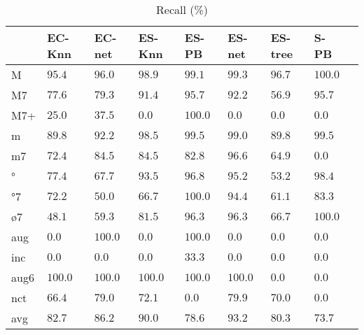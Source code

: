 \documentclass{article}
\begin{document}
\begin{table}
  \centering
\begin{tabular}{l|p{0.5cm}p{0.5cm}p{0.5cm}p{0.5cm}p{0.5cm}p{0.5cm}p{0.5cm}p{0.5cm}}
    &      EC-Knn &      EC-net &      ES-Knn &       ES-PB &      ES-net &     ES-tree &      S-PB \\ \hline
M   & $     95.4$ & $     96.0$ & $     98.9$ & $     99.1$ & $     99.3$ & $     96.7$ & $    100.0$ \\
M7  & $     77.6$ & $     79.3$ & $     91.4$ & $     95.7$ & $     92.2$ & $     56.9$ & $     95.7$ \\
M7+ & $     25.0$ & $     37.5$ & $      0.0$ & $    100.0$ & $      0.0$ & $      0.0$ & $      0.0$ \\
m   & $     89.8$ & $     92.2$ & $     98.5$ & $     99.5$ & $     99.0$ & $     89.8$ & $     99.5$ \\
m7  & $     72.4$ & $     84.5$ & $     84.5$ & $     82.8$ & $     96.6$ & $     64.9$ & $      0.0$ \\
°   & $     77.4$ & $     67.7$ & $     93.5$ & $     96.8$ & $     95.2$ & $     53.2$ & $     98.4$ \\
°7  & $     72.2$ & $     50.0$ & $     66.7$ & $    100.0$ & $     94.4$ & $     61.1$ & $     83.3$ \\
ø7  & $     48.1$ & $     59.3$ & $     81.5$ & $     96.3$ & $     96.3$ & $     66.7$ & $    100.0$ \\
aug & $      0.0$ & $    100.0$ & $      0.0$ & $    100.0$ & $      0.0$ & $      0.0$ & $      0.0$ \\
inc & $      0.0$ & $      0.0$ & $      0.0$ & $     33.3$ & $      0.0$ & $      0.0$ & $      0.0$ \\
aug6& $    100.0$ & $    100.0$ & $    100.0$ & $    100.0$ & $    100.0$ & $      0.0$ & $      0.0$ \\
nct & $     66.4$ & $     79.0$ & $     72.1$ & $      0.0$ & $     79.9$ & $     70.0$ & $      0.0$ \\
avg & $     82.7$ & $     86.2$ & $     90.0$ & $     78.6$ & $     93.2$ & $     80.3$ & $     73.7$ \\
\end{tabular}


  \caption{Recall (\%)}
  \label{tab:recall}
\end{table}
\end{document}

